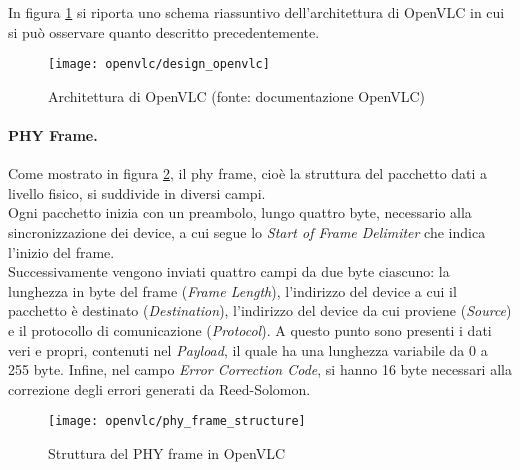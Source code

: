 In figura \ref{fig:design_openvlc} si riporta uno schema riassuntivo dell'architettura di OpenVLC in cui si può osservare quanto descritto precedentemente.
\begin{figure}[H] 
    \centering 
    \texttt{[image: openvlc/design\_openvlc]}
    \caption{Architettura di OpenVLC (fonte: documentazione OpenVLC)}
    \label{fig:design_openvlc}
\end{figure}

\paragraph{PHY Frame.}

Come mostrato in figura \ref{fig:phy_frame_structure}, il \gls{phy} frame, cioè la struttura del pacchetto dati a livello fisico, si suddivide in diversi campi.\\
Ogni pacchetto inizia con un preambolo, lungo quattro byte, necessario alla sincronizzazione dei device, a cui segue lo \textit{Start of Frame Delimiter} che indica l'inizio del frame.\\
Successivamente vengono inviati quattro campi da due byte ciascuno: la lunghezza in byte del frame (\textit{Frame Length}), l'indirizzo del device a cui il pacchetto è destinato (\textit{Destination}), l'indirizzo del device da cui proviene (\textit{Source}) e il protocollo di comunicazione (\textit{Protocol}).
A questo punto sono presenti i dati veri e propri, contenuti nel \textit{Payload}, il quale ha una lunghezza variabile da 0 a 255 byte.
Infine, nel campo \textit{Error Correction Code}, si hanno 16 byte necessari alla correzione degli errori generati da Reed-Solomon.
\begin{figure}[H] 
    \centering 
    \texttt{[image: openvlc/phy\_frame\_structure]}
    \caption{Struttura del PHY frame in OpenVLC}
    \label{fig:phy_frame_structure}
\end{figure}

